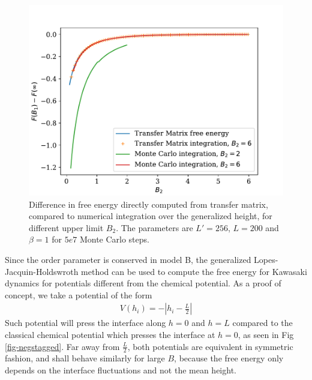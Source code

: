 \begin{figure}
    \centering
    \includegraphics[width=0.7\linewidth]{finite-size/integration-free-ene.pdf}
    \caption{Difference in free energy directly computed from transfer matrix, compared to numerical integration over the generalized height, for different upper limit $B_2$. The parameters are $L' = 256$, $L=200$ and $\beta=1$ for $5e7$ Monte Carlo steps.}
    \label{integration-free-ene}
\end{figure}

Since the order parameter is conserved in model B, the generalized Lopes-Jacquin-Holdswroth method can be used to compute the free energy for Kawasaki dynamics for potentials different from the chemical potential. 
As a proof of concept, we take a potential of the form
\begin{align}
    V(h_i) = - |h_i-\frac{L}{2}|
    \label{neggstaged}
\end{align}
Such potential will press the interface along $h=0$ and $h=L$ compared to the classical chemical potential which presses the interface at $h=0$, as seen in Fig \ref{fig-negstagged}. Far away from $\frac{L}{2}$, both potentials are equivalent in symmetric fashion, and shall behave similarly for large $B$, because the free energy only depends on the interface fluctuations and not the mean height. 


